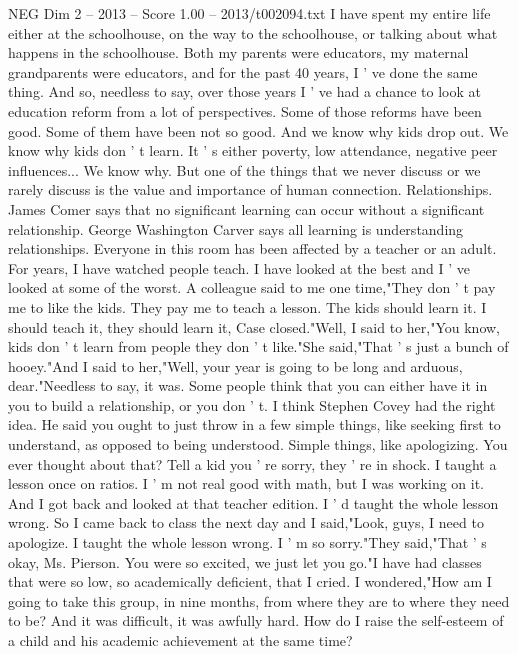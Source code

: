 \begin{textsample}{NEG Dim 2 – 2013 – Score 1.00 – 2013/t002094.txt}  \label{ex:f2_neg_030}
I have spent my entire life either at the schoolhouse, on the way to the schoolhouse, or talking about what happens in the schoolhouse.
Both my parents were educators, my maternal grandparents were educators, and for the past 40 years, I ' ve done the same thing.
And so, needless to say, over those years I ' ve had a chance to look at education reform from a lot of perspectives.
Some of those reforms have been good.
Some of them have been not so good.
And we know why kids drop out.
We know why kids don ' t learn.
It ' s either poverty, low attendance, negative peer influences...
We know why.
But one of the things that we never discuss or we rarely discuss is the value and importance of human connection.
Relationships.
James Comer says that no significant learning can occur without a significant relationship.
George Washington Carver says all learning is understanding relationships.
Everyone in this room has been affected by a teacher or an adult.
For years, I have watched people teach.
I have looked at the best and I ' ve looked at some of the worst.
A colleague said to me one time,"They don ' t pay me to like the kids.
They pay me to teach a lesson.
The kids should learn it.
I should teach it, they should learn it, Case closed."Well, I said to her,"You know, kids don ' t learn from people they don ' t like."She said,"That ' s just a bunch of hooey."And I said to her,"Well, your year is going to be long and arduous, dear."Needless to say, it was.
Some people think that you can either have it in you to build a relationship, or you don ' t.
I think Stephen Covey had the right idea.
He said you ought to just throw in a few simple things, like seeking first to understand, as opposed to being understood.
Simple things, like apologizing.
You ever thought about that?
Tell a kid you ' re sorry, they ' re in shock.
I taught a lesson once on ratios.
I ' m not real good with math, but I was working on it.
And I got back and looked at that teacher edition.
I ' d taught the whole lesson wrong.
So I came back to class the next day and I said,"Look, guys, I need to apologize.
I taught the whole lesson wrong.
I ' m so sorry."They said,"That ' s okay, Ms.
Pierson.
You were so excited, we just let you go."I have had classes that were so low, so academically deficient, that I cried.
I wondered,"How am I going to take this group, in nine months, from where they are to where they need to be?
And it was difficult, it was awfully hard.
How do I raise the self-esteem of a child and his academic achievement at the same time?

\end{textsample}
